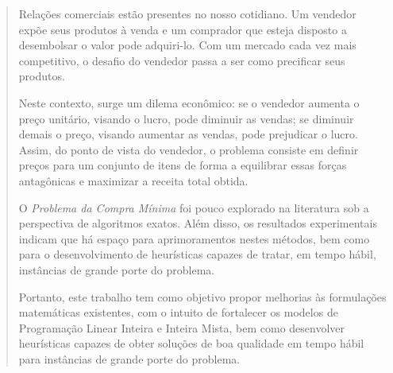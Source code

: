 \begin{abstract}
Relações comerciais estão presentes no nosso cotidiano. Um vendedor expõe seus produtos à venda e um comprador que esteja disposto a desembolsar o valor pode adquiri-lo. Com um mercado cada vez mais competitivo, o desafio do vendedor passa a ser como precificar seus produtos.


Neste contexto, surge um dilema econômico: se o vendedor aumenta o preço unitário, visando o lucro, pode diminuir as vendas; se diminuir demais o preço, visando aumentar as vendas, pode prejudicar o lucro. Assim, do ponto de vista do vendedor, o problema consiste em definir preços para um conjunto de itens de forma a equilibrar essas forças antagônicas e maximizar a receita total obtida.


O \textit{Problema da Compra Mínima} foi pouco explorado na literatura sob a perspectiva de algoritmos exatos. Além disso, os resultados experimentais indicam que há espaço para aprimoramentos nestes métodos, bem como para o desenvolvimento de heurísticas capazes de tratar, em tempo hábil, instâncias de grande porte do problema.

Portanto, este trabalho tem como objetivo propor melhorias às formulações matemáticas existentes, com o intuito de fortalecer os modelos de Programação Linear Inteira e Inteira Mista, bem como desenvolver heurísticas capazes de obter soluções de boa qualidade em tempo hábil para instâncias de grande porte do problema. 

\end{abstract}